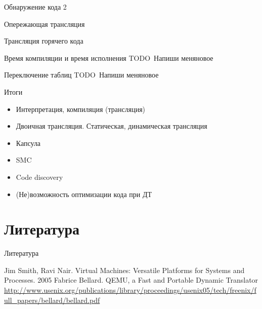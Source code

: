 \documentclass{beamer}
\newcommand{\todo}[1][Напиши меня]{{\color{red}TODO\ #1}}
\begin{document}
\begin{frame}{Обнаружение кода 2}


\end{frame}

\begin{frame}{Опережающая трансляция}

\end{frame}

\begin{frame}{Трансляция горячего кода}

\end{frame}

\begin{frame}{Время компиляции и время исполнения}
\todo новое
\end{frame}

\begin{frame}{Переключение таблиц}
\todo новое
\end{frame}


\begin{frame}{Итоги}
\begin{itemize}
\item Интерпретация, компиляция (трансляция)
\item Двоичная трансляция. Статическая, динамическая трансляция
\item Капсула
\item SMC
\item Code discovery
\item (Не)возможность оптимизации кода при ДТ
\end{itemize}
\end{frame}


\section*{Литература}

\begin{frame}[allowframebreaks]{Литература}
\begin{thebibliography}{99}
     Jim Smith, Ravi Nair. Virtual Machines: Versatile Platforms for Systems and Processes. 2005
     Fabrice Bellard. QEMU, a Fast and Portable Dynamic Translator \url{http://www.usenix.org/publications/library/proceedings/usenix05/tech/freenix/full_papers/bellard/bellard.pdf}

    
\end{thebibliography}
\end{frame}
\end{document}
